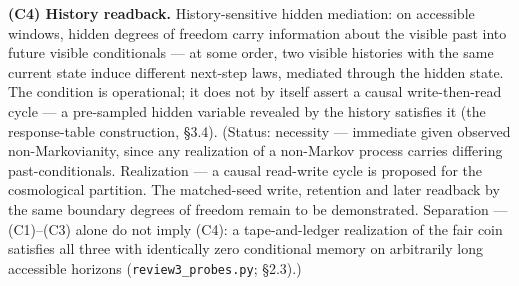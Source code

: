 \documentclass[
]{article}
\begin{document}
\textbf{(C4) History readback.} History-sensitive hidden mediation: on
accessible windows, hidden degrees of freedom carry information about
the visible past into future visible conditionals --- at some order, two
visible histories with the same current state induce different next-step
laws, mediated through the hidden state. The condition is operational;
it does not by itself assert a causal write-then-read cycle --- a
pre-sampled hidden variable revealed by the history satisfies it (the
response-table construction, §3.4). (Status: necessity --- immediate
given observed non-Markovianity, since any realization of a non-Markov
process carries differing past-conditionals. Realization --- a causal
read-write cycle is proposed for the cosmological partition. The
matched-seed write, retention and later readback by the same boundary
degrees of freedom remain to be demonstrated. Separation --- (C1)--(C3)
alone do not imply (C4): a tape-and-ledger realization of the fair coin
satisfies all three with identically zero conditional memory on
arbitrarily long accessible horizons (\texttt{review3\_probes.py};
§2.3).)
\end{document}
